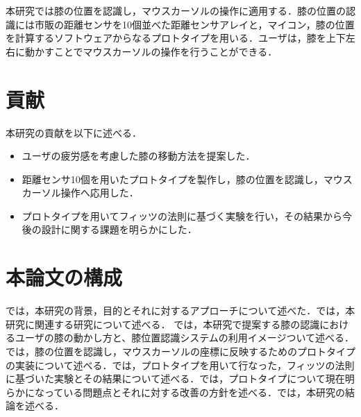 本研究では膝の位置を認識し，マウスカーソルの操作に適用する．膝の位置の認識には市販の距離センサを10個並べた距離センサアレイと，マイコン，膝の位置を計算するソフトウェアからなるプロトタイプを用いる．ユーザは，膝を上下左右に動かすことでマウスカーソルの操作を行うことができる．

\section{貢献}
本研究の貢献を以下に述べる．
\begin{itemize}
	\item ユーザの疲労感を考慮した膝の移動方法を提案した．
	\item 距離センサ10個を用いたプロトタイプを製作し，膝の位置を認識し，マウスカーソル操作へ応用した．
	\item プロトタイプを用いてフィッツの法則に基づく実験を行い，その結果から今後の設計に関する課題を明らかにした．
\end{itemize}
\section{本論文の構成}
では，本研究の背景，目的とそれに対するアプローチについて述べた．では，本研究に関連する研究について述べる．
では，本研究で提案する膝の認識におけるユーザの膝の動かし方と、膝位置認識システムの利用イメージついて述べる．では，膝の位置を認識し，マウスカーソルの座標に反映するためのプロトタイプの実装について述べる．では，プロトタイプを用いて行なった，フィッツの法則に基づいた実験とその結果について述べる．では，プロトタイプについて現在明らかになっている問題点とそれに対する改善の方針を述べる．では，本研究の結論を述べる．

\begin{comment}
	\fixme{
	\begin{itemize}
		\item 本研究では膝によるマウスカーソル操作を調査する？
		\item 足を使ってみたい
		\item 足先の研究しかない，膝と組み合わせることで様々なインタラクションが可能になる
		\item 膝使ったものは少なく問題がある
		\item 膝を使ったことの理由→足の既存手法と組み合わせることができる，膝の可動域が広い（が先行研究が少ない
		\item いずれにせよ，関連研究が終わるまでに「膝によるマウスカーソル操作」という話に落とし込む
	\end{itemize}
}
\end{comment}
